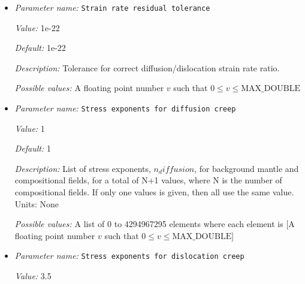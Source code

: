 \begin{itemize}
{\it Value:} 1e22


{\it Default:} 1e22


{\it Description:} Reference viscosity for nondimensionalization. Units $Pa s$


{\it Possible values:} A floating point number $v$ such that $0 \leq v \leq \text{MAX\_DOUBLE}$
\item {\it Parameter name:} {\tt Strain rate residual tolerance}
\label{parameters:Material model/Diffusion dislocation/Strain rate residual tolerance}


{\it Value:} 1e-22


{\it Default:} 1e-22


{\it Description:} Tolerance for correct diffusion/dislocation strain rate ratio.


{\it Possible values:} A floating point number $v$ such that $0 \leq v \leq \text{MAX\_DOUBLE}$
\item {\it Parameter name:} {\tt Stress exponents for diffusion creep}
\label{parameters:Material model/Diffusion dislocation/Stress exponents for diffusion creep}


{\it Value:} 1


{\it Default:} 1


{\it Description:} List of stress exponents, $n_diffusion$, for background mantle and compositional fields, for a total of N+1 values, where N is the number of compositional fields. If only one values is given, then all use the same value.  Units: None


{\it Possible values:} A list of 0 to 4294967295 elements where each element is [A floating point number $v$ such that $0 \leq v \leq \text{MAX\_DOUBLE}$]
\item {\it Parameter name:} {\tt Stress exponents for dislocation creep}
\label{parameters:Material model/Diffusion dislocation/Stress exponents for dislocation creep}


{\it Value:} 3.5



\end{itemize}
